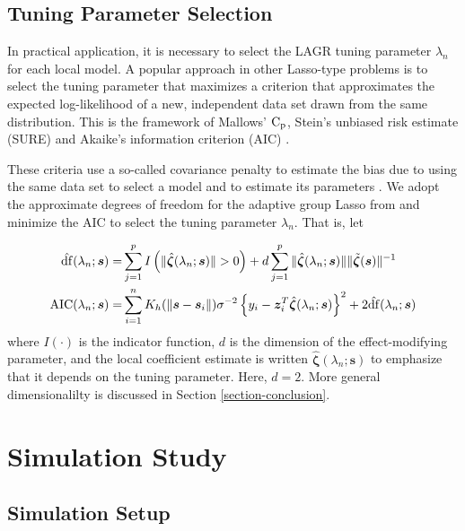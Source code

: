 \documentclass[authoryear,review, 12pt]{elsarticle}
\begin{document}
\subsection{Tuning Parameter Selection}

In practical application, it is necessary to select the LAGR tuning
parameter $\lambda_{n}$ for each local model. A popular approach
in other Lasso-type problems is to select the tuning parameter that
maximizes a criterion that approximates the expected log-likelihood
of a new, independent data set drawn from the same distribution. This
is the framework of Mallows' ${\rm C_p}$, Stein's unbiased risk estimate (SURE)
and Akaike's information criterion (AIC) \citep{Mallows-1973,Stein-1981,Akaike-1973}.

These criteria use a so-called covariance penalty to estimate the
bias due to using the same data set to select a model and to estimate
its parameters \citep{Efron:2004a}. We adopt the approximate degrees
of freedom for the adaptive group Lasso from \citet{Yuan-Lin-2006}
and minimize the AIC to select the tuning parameter $\lambda_{n}$. That is, let

\begin{align*}
\hat{{\rm df}}(\lambda_{n};\bm{s})= & \sum_{j=1}^{p}I\left(\|\hat{\bm{\zeta}}(\lambda_{n};\bm{s})\|>0\right) + d \sum_{j=1}^{p}\|\hat{\bm{\zeta}}(\lambda_{n};\bm{s})\|\|\tilde{\bm{\zeta}}(\bm{s})\|^{-1}\\
\text{AIC}(\lambda_{n};\bm{s})= & \sum_{i=1}^{n}K_{h}(\|\bm{s}-\bm{s}_{i}\|)\sigma^{-2}\left\{ y_{i}-\bm{z}_{i}^{T}\hat{\bm{\zeta}}(\lambda_{n};\bm{s})\right\} ^{2}+2\hat{{\rm df}}(\lambda_{n};\bm{s})\\
\end{align*}
where $I\left(\cdot\right)$ is the indicator function, $d$ is the dimension of the effect-modifying parameter, and the local
coefficient estimate is written $\hat{\bm{\zeta}}(\lambda_{n};\bm{s})$
to emphasize that it depends on the tuning parameter. Here, $d=2$. More general dimensionalilty is discussed in Section \ref{section-conclusion}.

\section{Simulation Study\label{sec:simulations}}

\subsection{Simulation Setup}
\end{document}
